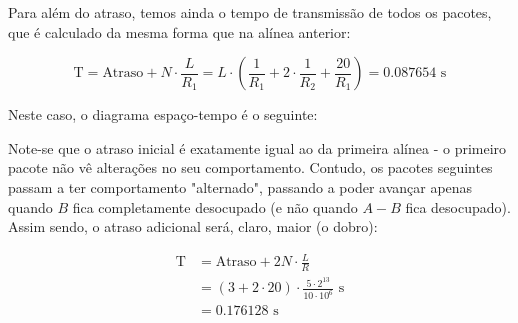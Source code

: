 \begin{enumerate}[leftmargin=\labelsep]
        Para além do atraso, temos ainda o tempo de transmissão de todos os pacotes,
        que é calculado da mesma forma que na alínea anterior:

        $$
          \text{T} = \text{Atraso} + N \cdot \frac{L}{R_1}
          = L \cdot \left( \frac{1}{R_1} + 2 \cdot \frac{1}{R_2} + \frac{20}{R_1} \right)
          = 0.087654 \text{ s}
        $$


        Neste caso, o diagrama espaço-tempo é o seguinte:

        \begin{figure}[H]
          \centering
          
        \end{figure}

        Note-se que o atraso inicial é exatamente igual ao da primeira alínea - o primeiro pacote não vê
        alterações no seu comportamento. Contudo, os pacotes seguintes passam a ter
        comportamento "alternado", passando a poder avançar apenas quando $B$ fica
        completamente desocupado (e não quando $A-B$ fica desocupado). Assim sendo,
        o atraso adicional será, claro, maior (o dobro):

        $$
          \begin{aligned}
            \text{T} & = \text{Atraso} + 2N \cdot \frac{L}{R}                                  \\
                     & = (3 + 2 \cdot 20) \cdot \frac{5 \cdot 2^{13}}{10 \cdot 10^6} \text{ s} \\
                     & = 0.176128 \text{ s}
          \end{aligned}
        $$

\end{enumerate}
